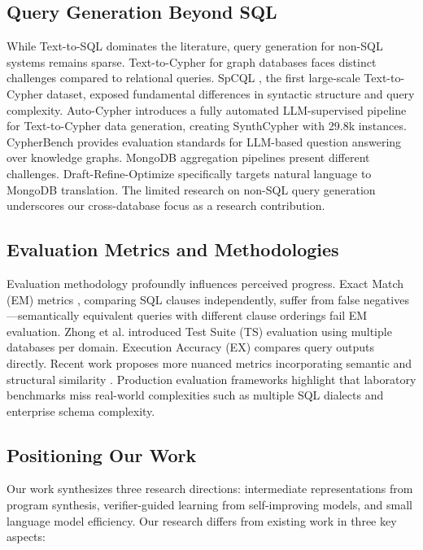 \documentclass[conference]{IEEEtran}
\begin{document}
\subsection{Query Generation Beyond SQL}

While Text-to-SQL dominates the literature, query generation for non-SQL systems remains sparse. Text-to-Cypher for graph databases faces distinct challenges compared to relational queries. SpCQL \cite{c38}, the first large-scale Text-to-Cypher dataset, exposed fundamental differences in syntactic structure and query complexity. Auto-Cypher \cite{c39} introduces a fully automated LLM-supervised pipeline for Text-to-Cypher data generation, creating SynthCypher with 29.8k instances. CypherBench \cite{c40} provides evaluation standards for LLM-based question answering over knowledge graphs. MongoDB aggregation pipelines present different challenges. Draft-Refine-Optimize \cite{c41} specifically targets natural language to MongoDB translation. The limited research on non-SQL query generation underscores our cross-database focus as a research contribution.

\subsection{Evaluation Metrics and Methodologies}

Evaluation methodology profoundly influences perceived progress. Exact Match (EM) metrics \cite{b2}, comparing SQL clauses independently, suffer from false negatives—semantically equivalent queries with different clause orderings fail EM evaluation. Zhong et al. \cite{c42} introduced Test Suite (TS) evaluation using multiple databases per domain. Execution Accuracy (EX) \cite{b2} compares query outputs directly. Recent work proposes more nuanced metrics incorporating semantic and structural similarity \cite{c43}. Production evaluation frameworks \cite{c44} highlight that laboratory benchmarks miss real-world complexities such as multiple SQL dialects and enterprise schema complexity.

\subsection{Positioning Our Work}

Our work synthesizes three research directions: intermediate representations from program synthesis, verifier-guided learning from self-improving models, and small language model efficiency. Our research differs from existing work in three key aspects:
\end{document}
